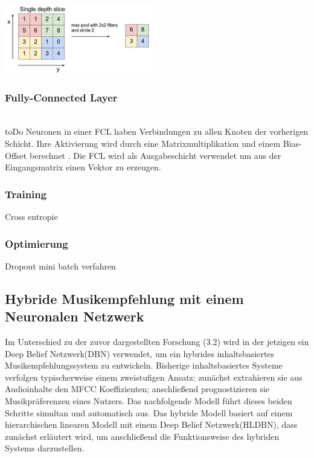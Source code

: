 \documentclass[twosided,a4,10pt]{article}
\begin{document}
\begin{multicols}{2}
		\begin{minipage}{0.4\textwidth}
			\centering
			\includegraphics{img/pooling.png}
			\label{img:pooling}
		\end{minipage}\newline
		
		\subsubsection*{Fully-Connected Layer} \\toDo
		Neuronen in einer FCL haben Verbindungen zu allen Knoten der vorherigen Schicht. Ihre Aktivierung wird durch eine Matrixmultiplikation und einem Bias-Offset berechnet \cite{karpathy}. Die FCL wird als Ausgabeschicht verwendet um aus der Eingangsmatrix einen Vektor zu erzeugen.
		
		\subsubsection{Training}
		Cross entropie
		
		\subsubsection{Optimierung}
		Dropout
		mini batch verfahren
		\subsection{}
		
		\subsection{Hybride Musikempfehlung mit einem Neuronalen Netzwerk}
		Im Unterschied zu der zuvor dargestellten Forschung (3.2) wird in der jetzigen ein Deep Belief Netzwerk(DBN) verwendet, um ein hybrides inhaltsbasiertes Musikempfehlungssystem zu entwickeln. Bisherige inhaltsbasiertes Systeme verfolgen typischerweise einem zweistufigen Ansatz: zunächst extrahieren sie aus Audioinhalte den MFCC Koeffizienten; anschließend prognostizieren sie Musikpräferenzen eines Nutzers. Das nachfolgende Modell führt dieses beiden Schritte simultan und automatisch aus. \cite{wang}\newline
		Das hybride Modell basiert auf einem hierarchischen linearen Modell mit einem Deep Belief Netzwerk(HLDBN), dass zunächst erläutert wird, um anschließend die Funktionsweise des hybriden Systems darzustellen.
		

\end{multicols}
\end{document}
